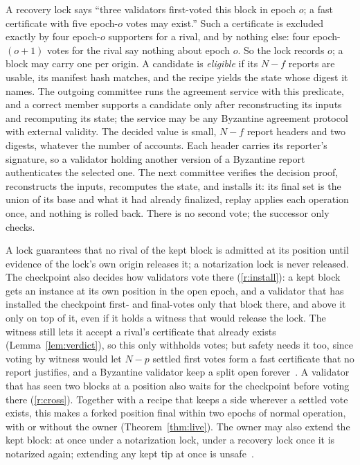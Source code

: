 A recovery lock says ``three validators first-voted this block in epoch $o$; a fast certificate with five epoch-$o$ votes may exist.'' Such a certificate is excluded exactly by four epoch-$o$ supporters for a rival, and by nothing else: four epoch-$(o+1)$ votes for the rival say nothing about epoch $o$. So the lock records $o$; a block may carry one per origin.
A candidate is \emph{eligible} if its $N-f$ reports are usable, its manifest hash matches, and the recipe yields the state whose digest it names. The outgoing committee runs the agreement service with this predicate, and a correct member supports a candidate only after reconstructing its inputs and recomputing its state; the service may be any Byzantine agreement protocol with external validity. The decided value is small, $N-f$ report headers and two digests, whatever the number of accounts. Each header carries its reporter's signature, so a validator holding another version of a Byzantine report authenticates the selected one. The next committee verifies the decision proof, reconstructs the inputs, recomputes the state, and installs it: its final set is the union of its base and what it had already finalized, replay applies each operation once, and nothing is rolled back. There is no second vote; the successor only checks.

A lock guarantees that no rival of the kept block is admitted at its position until evidence of the lock's own origin releases it; a notarization lock is never released. The checkpoint also decides how validators vote there (\ref{r:install}): a kept block gets an instance at its own position in the open epoch, and a validator that has installed the checkpoint first- and final-votes only that block there, and above it only on top of it, even if it holds a witness that would release the lock. The witness still lets it accept a rival's certificate that already exists (Lemma~\ref{lem:verdict}), so this only withholds votes; but safety needs it too, since voting by witness would let $N-p$ settled first votes form a fast certificate that no report justifies, and a Byzantine validator keep a split open forever~\cite{extended}. A validator that has seen two blocks at a position also waits for the checkpoint before voting there (\ref{r:cross}). Together with a recipe that keeps a side wherever a settled vote exists, this makes a forked position final within two epochs of normal operation, with or without the owner (Theorem~\ref{thm:live}). The owner may also extend the kept block: at once under a notarization lock, under a recovery lock once it is notarized again; extending any kept tip at once is unsafe~\cite[Case~5]{extended}.
